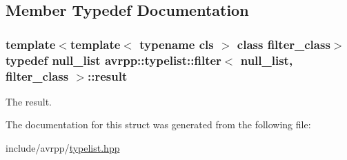 \subsection{Member Typedef Documentation}
\hypertarget{structavrpp_1_1typelist_1_1filter_3_01null__list_00_01filter__class_01_4_a04b3cd15c5ec2e7efbc62e45e67b905e}{
\subsubsection[{result}]{\setlength{\rightskip}{0pt plus 5cm}template$<$template$<$ typename cls $>$ class filter\_\-class$>$ typedef {\bf null\_\-list} avrpp::typelist::filter$<$ {\bf null\_\-list}, filter\_\-class $>$::{\bf result}}}
\label{structavrpp_1_1typelist_1_1filter_3_01null__list_00_01filter__class_01_4_a04b3cd15c5ec2e7efbc62e45e67b905e}


The result. 



The documentation for this struct was generated from the following file:\begin{DoxyCompactItemize}
\item 
include/avrpp/\hyperlink{typelist_8hpp}{typelist.hpp}\end{DoxyCompactItemize}

